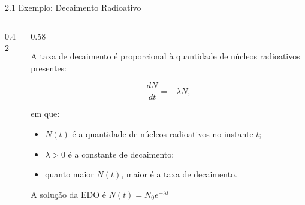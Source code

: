 \documentclass[11pt, aspectratio=169, xcolor=table]{beamer}
\begin{document}
\begin{frame}{2.1 Exemplo: Decaimento Radioativo}
\begin{columns}[T]

\begin{column}{0.42\textwidth}
\end{column}

\begin{column}{0.58\textwidth}

A taxa de decaimento é proporcional à quantidade de núcleos radioativos presentes:

\[
\frac{dN}{dt}=-\lambda N,
\]

em que:

\begin{itemize}
    \item $N(t)$ é a quantidade de núcleos radioativos no instante $t$;
    \item $\lambda>0$ é a constante de decaimento;
    \item quanto maior $N(t)$, maior é a taxa de decaimento.
\end{itemize}

A solução da EDO é $N(t)=N_0e^{-\lambda t}$
\end{column}

\end{columns}
\end{frame}
\end{document}
